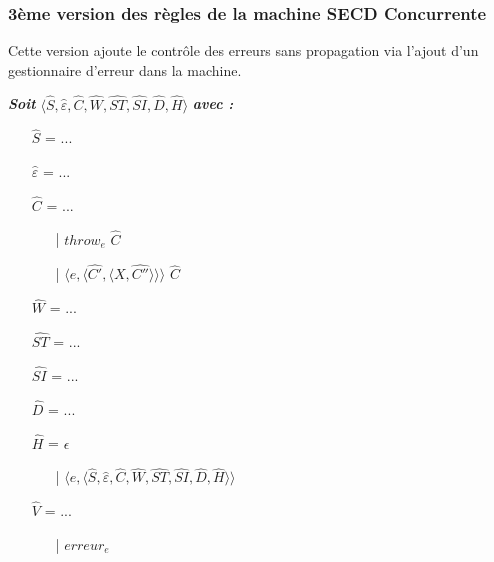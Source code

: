 \documentclass[10pt,a4paper]{article}
\begin{document}
				\subsubsection{3ème version des règles de la machine SECD Concurrente}\label{SECDConc3}
					\smallbreak
					Cette version ajoute le contrôle des erreurs sans propagation via l'ajout d'un gestionnaire d'erreur dans la machine.
					\bigbreak
					
					\textbf{\textit{Soit}} $\langle\widehat{S},\widehat{\varepsilon},\widehat{C},\widehat{W},\widehat{ST},\widehat{SI},\widehat{D},\widehat{H}\rangle$ \textbf{\textit{avec :}}
				
				\begin{itemize}
					\item[] $\widehat{S}$ = ... 
					\item[] $\widehat{\varepsilon}$ = ... 
					\item[] $\widehat{C}$ = ...
					\begin{itemize}
						\item[|] $throw_{e} $ $\widehat{C}$
						\item[|] $\langle e,\langle\widehat{C'},\langle X,\widehat{C''}\rangle\rangle\rangle$ $\widehat{C}$ 
					\end{itemize}
					\item[] $\widehat{W}$ = ...
					\item[] $\widehat{ST}$ = ...
					\item[] $\widehat{SI}$ = ...
					\item[] $\widehat{D}$ = ...
					\item[] $\widehat{H}$ = $\epsilon$ 
					\begin{itemize}
						\item[|] $\langle e,\langle\widehat{S},\widehat{\varepsilon},\widehat{C},\widehat{W},\widehat{ST},\widehat{SI},\widehat{D},\widehat{H}\rangle\rangle$ 
					\end{itemize}
					\item[] $\widehat{V}$ = ... 
					\begin{itemize}
						\item[|] $erreur_{e}$
					\end{itemize}
				\end{itemize}
				\bigbreak
				\bigbreak
				
\end{document}
